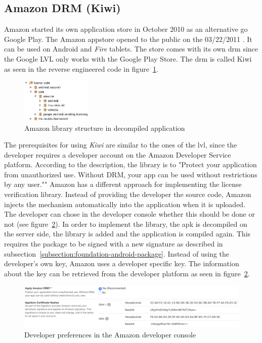 \subsection{Amazon DRM (Kiwi)} \label{section:license-amazon}
Amazon started its own application store in October 2010 \cite{amazonBeta} as an alternative go Google Play.
The Amazon appstore opened to the public on the 03/22/2011 \cite{amazonRelease}.
It can be used on Android and \textit{Fire} tablets.
The store comes with its own \gls{drm} since the Google LVL only works with the Google Play Store.
The \gls{drm} is called Kiwi as seen in the reverse engineered code in figure~\ref{fig:amazonFolder}.
\newline
\begin{figure}[h]
    \centering
    \includegraphics[width=0.3\textwidth]{data/amazonFolder.png}
    \caption{Amazon library structure in decompiled application}
    \label{fig:amazonFolder}
\end{figure}
The prerequisites for using \textit{Kiwi} are similar to the ones of the \gls{lvl}, since the developer requires a developer account on the Amazon Developer Service platform.
According to the description, the library is to "Protect your application from unauthorized use. Without DRM, your app can be used without restrictions by any user."" \cite{amazonDeveloper}
\newline
Amazon has a different approach for implementing the license verification library.
Instead of providing the developer the source code, Amazon injects the mechanism automatically into the application when it is uploaded.
The developer can chose in the developer console whether this should be done or not (see figure~\ref{fig:amazon}).
In order to implement the library, the \gls{apk} is decompiled on the server side, the library is added and the application is compiled again.
This requires the package to be signed with a new signature as described in subsection~\ref{subsection:foundation-android-package}.
Instead of using the developer's own key, Amazon uses a developer specific key.
The information about the key can be retrieved from the developer platform as seen in figure~\ref{fig:amazon}. \cite{amazonDeveloper}
\newline
\begin{figure}[h]
    \centering
    \includegraphics[width=1\textwidth]{data/amazon.png}
    \caption{Developer preferences in the Amazon developer console \cite{amazonDeveloper}}
    \label{fig:amazon}
\end{figure}
